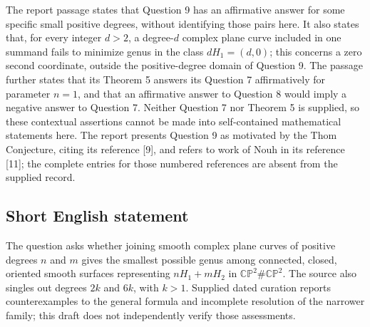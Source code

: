 \documentclass[11pt]{article}
\begin{document}
The report passage states that Question 9 has an affirmative answer for some specific small positive degrees, without identifying those pairs here. It also states that, for every integer \(d>2\), a degree-\(d\) complex plane curve included in one summand fails to minimize genus in the class \(dH_1=(d,0)\); this concerns a zero second coordinate, outside the positive-degree domain of Question 9. The passage further states that its Theorem 5 answers its Question 7 affirmatively for parameter \(n=1\), and that an affirmative answer to Question 8 would imply a negative answer to Question 7. Neither Question 7 nor Theorem 5 is supplied, so these contextual assertions cannot be made into self-contained mathematical statements here. The report presents Question 9 as motivated by the Thom Conjecture, citing its reference [9], and refers to work of Nouh in its reference [11]; the complete entries for those numbered references are absent from the supplied record.
\subsection{Short English statement}
The question asks whether joining smooth complex plane curves of positive degrees \(n\) and \(m\) gives the smallest possible genus among connected, closed, oriented smooth surfaces representing \(nH_1+mH_2\) in \(\mathbb{CP}^{2}\#\mathbb{CP}^{2}\). The source also singles out degrees \(2k\) and \(6k\), with \(k>1\). Supplied dated curation reports counterexamples to the general formula and incomplete resolution of the narrower family; this draft does not independently verify those assessments.
\end{document}
